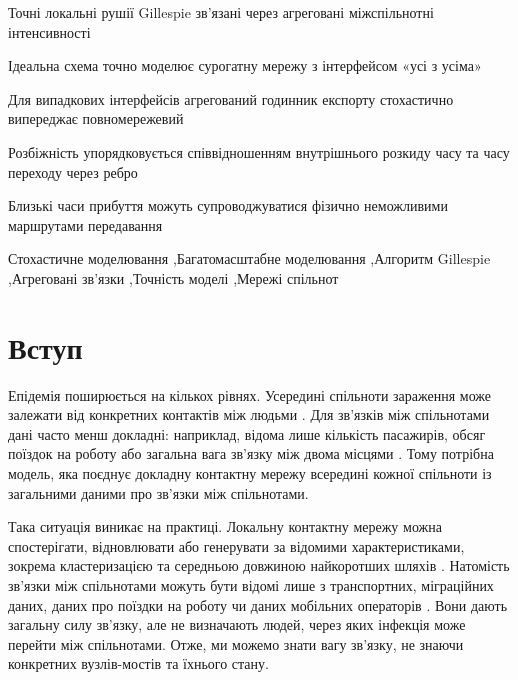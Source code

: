 \begin{highlights}
\item Точні локальні рушії Gillespie зв'язані через агреговані міжспільнотні інтенсивності
\item Ідеальна схема точно моделює сурогатну мережу з інтерфейсом «усі з усіма»
\item Для випадкових інтерфейсів агрегований годинник експорту стохастично випереджає повномережевий
\item Розбіжність упорядковується співвідношенням внутрішнього розкиду часу та часу переходу через ребро
\item Близькі часи прибуття можуть супроводжуватися фізично неможливими маршрутами передавання
\end{highlights}

\begin{keywords}
Стохастичне моделювання \sep Багатомасштабне моделювання \sep Алгоритм Gillespie \sep Агреговані зв'язки \sep Точність моделі \sep Мережі спільнот
\end{keywords}

\maketitle

\clearpage
\begingroup\color{black}
\hypersetup{citecolor=black,linkcolor=black}

\section{Вступ}
\label{sec:introduction}

Епідемія поширюється на кількох рівнях. Усередині спільноти зараження може залежати від конкретних контактів між людьми \citep{keeling2005,pastorsatorras2015,kiss2017}. Для зв'язків між спільнотами дані часто менш докладні: наприклад, відома лише кількість пасажирів, обсяг поїздок на роботу або загальна вага зв'язку між двома місцями \citep{balcan2009,barbosa2018human}. Тому потрібна модель, яка поєднує докладну контактну мережу всередині кожної спільноти із загальними даними про зв'язки між спільнотами.

Така ситуація виникає на практиці. Локальну контактну мережу можна спостерігати, відновлювати або генерувати за відомими характеристиками, зокрема кластеризацією та середньою довжиною найкоротших шляхів \citep{eubank2004,danon2011}. Натомість зв'язки між спільнотами можуть бути відомі лише з транспортних, міграційних даних, даних про поїздки на роботу чи даних мобільних операторів \citep{barbosa2018human,chang2021}. Вони дають загальну силу зв'язку, але не визначають людей, через яких інфекція може перейти між спільнотами. Отже, ми можемо знати вагу зв'язку, не знаючи конкретних вузлів-мостів та їхнього стану.

